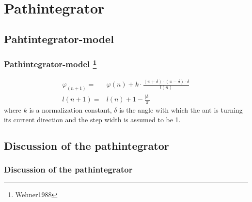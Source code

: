 \documentclass[ignorenonframetext]{beamer}
\begin{document}
\section{Pathintegrator}



\subsection{Pahtintegrator-model}
\begin{frame}
\frametitle{Pathintegrator-model \footnote{Wehner1988}}
\begin{align*}
\varphi_(n+1) =& \varphi(n) +k \cdot \frac{(\pi +\delta)\cdot(\pi-\delta)\cdot \delta}{l(n)}\\
l(n+1) =& l(n) +1 -\frac{|\delta|}{\pi}
\end{align*}
where $k$ is a normalization constant, $\delta$ is the angle with which the ant is turning its current direction and the step width is assumed to be 1.







\end{frame}

\subsection{Discussion of the pathintegrator}
\begin{frame}
\frametitle{Discussion of the pathintegrator}








\end{frame}
\end{document}
